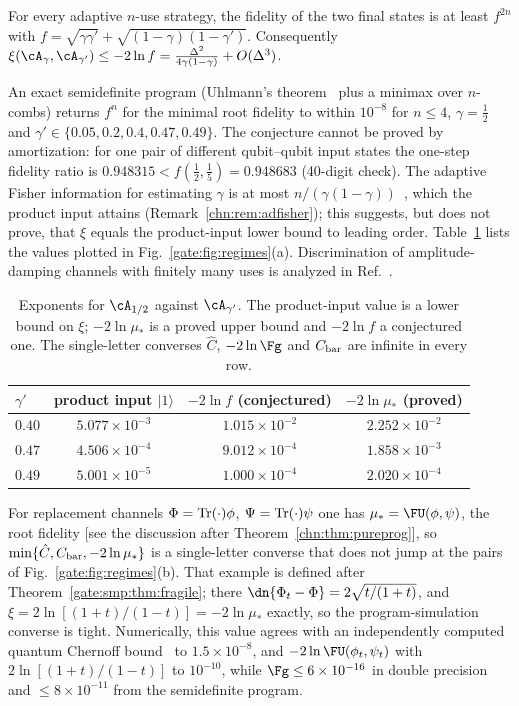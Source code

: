 \begin{conjecture*}%
For every adaptive $n$-use strategy, the fidelity of the two final states is at least $f^{2n}$ with $f=\sqrt{\gamma\gamma'}+\sqrt{(1-\gamma)(1-\gamma')}$. Consequently $\xi(\cA_\gamma,\cA_{\gamma'})\le-2\ln f=\frac{\Delta^2}{4\gamma(1-\gamma)}+O(\Delta^3)$.
\end{conjecture*}

An exact semidefinite program (Uhlmann's theorem~\cite{Uhlmann1976} plus a minimax over $n$-combs) returns $f^n$ for the minimal root fidelity to within $10^{-8}$ for $n\le4$, $\gamma=\frac12$ and $\gamma'\in\{0.05,0.2,0.4,0.47,0.49\}$. The conjecture cannot be proved by amortization: for one pair of different qubit--qubit input states the one-step fidelity ratio is $0.948315<f(\frac12,\frac15)=0.948683$ (40-digit check). The adaptive Fisher information for estimating $\gamma$ is at most $n/(\gamma(1-\gamma))$~\cite{DemkowiczDobrzanskiMaccone2014}, which the product input attains (Remark~\ref{chn:rem:adfisher}); this suggests, but does not prove, that $\xi$ equals the product-input lower bound to leading order. Table~\ref{gate:tab:Sad} lists the values plotted in Fig.~\ref{gate:fig:regimes}(a). Discrimination of amplitude-damping channels with finitely many uses is analyzed in Ref.~\cite{RexitiMancini2021}.

\begin{table}[!tbp]
\centering
\caption{Exponents for $\cA_{1/2}$ against $\cA_{\gamma'}$. The product-input value is a lower bound on $\xi$; $-2\ln\mu_*$ is a proved upper bound and $-2\ln f$ a conjectured one. The single-letter converses $\hat C$, $-2\ln\Fg$ and $C_{\rm bar}$ are infinite in every row.}
\label{gate:tab:Sad}
\begin{tabular}{lccc}
\toprule
$\gamma'$ & product input $|1\rangle$ & $-2\ln f$ (conjectured) & $-2\ln\mu_*$ (proved)\\
\midrule
$0.40$ & $5.077\times10^{-3}$ & $1.015\times10^{-2}$ & $2.252\times10^{-2}$\\
$0.47$ & $4.506\times10^{-4}$ & $9.012\times10^{-4}$ & $1.858\times10^{-3}$\\
$0.49$ & $5.001\times10^{-5}$ & $1.000\times10^{-4}$ & $2.020\times10^{-4}$\\
\bottomrule
\end{tabular}
\end{table}

For replacement channels $\Phi=\operatorname{Tr}(\cdot)\phi$, $\Psi=\operatorname{Tr}(\cdot)\psi$ one has $\mu_*=\FU(\phi,\psi)$, the root fidelity [see the discussion after Theorem~\ref{chn:thm:pureprog}], so $\min\{\hat C,C_{\rm bar},-2\ln\mu_*\}$ is a single-letter converse that does not jump at the pairs of Fig.~\ref{gate:fig:regimes}(b). That example is defined after Theorem~\ref{gate:smp:thm:fragile}; there $\dn{\Phi_t-\Phi}=2\sqrt{t/(1+t)}$, and $\xi=2\ln[(1+t)/(1-t)]=-2\ln\mu_*$ exactly, so the program-simulation converse is tight. Numerically, this value agrees with an independently computed quantum Chernoff bound~\cite{AudenaertChernoff2007} to $1.5\times10^{-8}$, and $-2\ln\FU(\phi_t,\psi_t)$ with $2\ln[(1+t)/(1-t)]$ to $10^{-10}$, while $\Fg\le6\times10^{-16}$ in double precision and $\le8\times10^{-11}$ from the semidefinite program.

